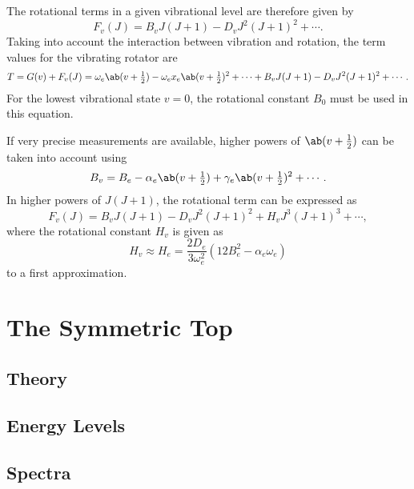 The rotational terms in a given vibrational level are therefore given by
\begin{equation*}
    F_{v}(J) = B_{v}J(J + 1) - D_{v}J^{2}(J + 1)^{2} + \dotsb.
\end{equation*}
Taking into account the interaction between vibration and rotation, the term values for the vibrating rotator are
\begin{equation*}
    T = G(v) + F_{v}(J) = \omega_{e}\ab(v + \tfrac{1}{2}) - \omega_{e}x_{e}\ab(v + \tfrac{1}{2})^{2} + \dotsb + B_{v}J(J + 1) - D_{v}J^{2}(J + 1)^{2} + \dotsb.
\end{equation*}
For the lowest vibrational state $v = 0$, the rotational constant $B_{0}$ must be used in this equation.

If very precise measurements are available, higher powers of $\ab(v + \tfrac{1}{2})$ can be taken into account using
\begin{equation*}
    B_{v} = B_{e} - \alpha_{e}\ab(v + \tfrac{1}{2}) + \gamma_{e}\ab(v + \tfrac{1}{2})^{2} + \dotsb.
\end{equation*}
In higher powers of $J(J + 1)$, the rotational term can be expressed as
\begin{equation*}
    F_{v}(J) = B_{v}J(J + 1) - D_{v}J^{2}(J + 1)^{2} + H_{v}J^{3}(J + 1)^{3} + \dotsb,
\end{equation*}
where the rotational constant $H_{v}$ is given as
\begin{equation*}
    H_{v} \approx H_{e} = \frac{2D_{e}}{3\omega_{e}^{2}}(12B_{e}^{2} - \alpha_{e}\omega_{e})
\end{equation*}
to a first approximation.

\section{The Symmetric Top}
\label{s:the_symmetric_top}

\subsection{Theory}

\subsection{Energy Levels}

\subsection{Spectra}
